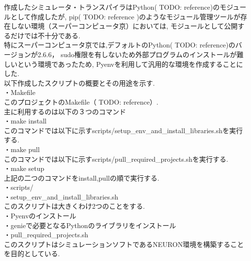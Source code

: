 作成したシミュレータ・トランスパイラはPython( TODO: reference)のモジュールとして作成したが,
pip( TODO: reference )のようなモジュール管理ツールが存在しない環境（スーパーコンピュータ京）においては,
モジュールとして公開するだけでは不十分である.\\
特にスーパーコンピュータ京では,デフォルトのPython( TODO: reference)のバージョンが2.6.6，
sudo権限を有しないため外部プログラムのインストールが難しいという環境であったため,
Pyenvを利用して汎用的な環境を作成することにした.\\
以下作成したスクリプトの概要とその用途を示す.\\
・Makefile\\
このプロジェクトのMakefile（ TODO: reference）.\\
主に利用するのは以下の３つのコマンド\\
\indent ・make install\\
\indent \indent このコマンドでは以下に示すscripts/setup\_env\_and\_install\_libraries.shを実行する.\\
\indent ・make pull\\
\indent \indent このコマンドでは以下に示すscripts/pull\_required\_projects.shを実行する.\\
\indent ・make setup\\
\indent \indent 上記の二つのコマンドをinstall,pullの順で実行する.\\
・scripts/\\
\indent ・setup\_env\_and\_install\_libraries.sh\\
\indent \indent このスクリプトは大きくわけ2つのことをする.\\
\indent \indent ・Pyenvのインストール\\
\indent \indent ・genieで必要となるPythonのライブラリをインストール\\
\indent ・pull\_required\_projects.sh\\
\indent \indent このスクリプトはシミュレーションソフトであるNEURON環境を構築することを目的としている.\\
